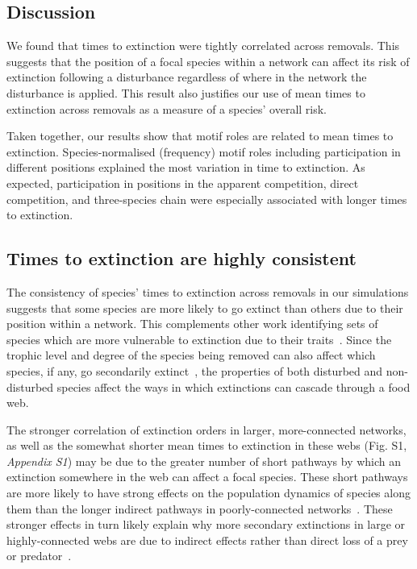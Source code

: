 \documentclass[12pt]{article}
\begin{document}
\begin{spacing}{2.0}
    
\section*{Discussion}

    We found that times to extinction were tightly correlated across removals. 
    This suggests that the position of a focal species within a network can affect its risk of extinction following a disturbance regardless of where in the network the disturbance is applied. 
    This result also justifies our use of mean times to extinction across removals as a measure of a species' overall risk.
    
    
    Taken together, our results show that motif roles are related to mean times to extinction.
    Species-normalised (frequency) motif roles including participation in different positions explained the most variation in time to extinction.
    As expected, participation in positions in the apparent competition, direct competition, and three-species chain were especially associated with longer times to extinction.


 	\subsection*{Times to extinction are highly consistent}

		The consistency of species' times to extinction across removals in our simulations suggests that some species are more likely to go extinct than others due to their position within a network.
        This complements other work identifying sets of species which are more vulnerable to extinction due to their traits~\citep{Curtsdotter2011,Ryser2019}. 
		Since the trophic level and degree of the species being removed can also affect which species, if any, go secondarily extinct~\citep{Wootton2016a,Dunne2002}, the properties of both disturbed and non-disturbed species affect the ways in which extinctions can cascade through a food web.
		
		
		The stronger correlation of extinction orders in larger, more-connected networks, as well as the somewhat shorter mean times to extinction in these webs (Fig. S1, \emph{Appendix S1}) may be due to the greater number of short pathways by which an extinction somewhere in the web can affect a focal species. 
		These short pathways are more likely to have strong effects on the population dynamics of species along them than the longer indirect pathways in poorly-connected networks~\citep{Jordan2002,Jordan2006}.
		These stronger effects in turn likely explain why more secondary extinctions in large or highly-connected webs are due to indirect effects rather than direct loss of a prey or predator~\citep{Wootton2016a}. 



\end{spacing}
\end{document}
